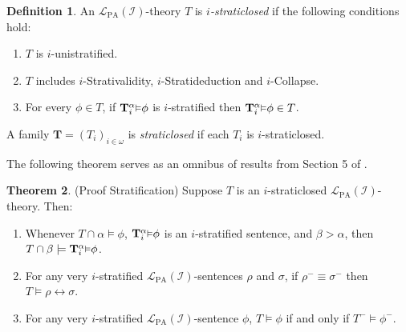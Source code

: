 \documentclass[reqno]{article}
\theoremstyle{definition}
\newtheorem{theorem}{Theorem}
\newtheorem{definition}[theorem]{Definition}
\def\L{\mathscr{L}}
\def\T{\mathbf{T}}
\def\LPA{\L_{\mathrm{PA}}}
\def\indset{\mathcal I}
\newcommand{\Prr}[2]{\T^{#1}_{#2}\mbox{\small${\vDash}$}}
\begin{document}
\begin{definition}
\label{straticloseddefn}
An $\LPA(\indset)$-theory $T$ is \emph{$i$-straticlosed} if
the following conditions hold:
\begin{enumerate}
\item $T$ is $i$-unistratified.
\item $T$ includes $i$-Strativalidity, $i$-Stratideduction and $i$-Collapse.
\item For every $\phi\in T$, if $\Prr\alpha i\phi$ is $i$-stratified then
$\Prr\alpha i\phi\in T$.
\end{enumerate}
A family $\T=(T_i)_{i\in\omega}$ is \emph{straticlosed} if each $T_i$ is
$i$-straticlosed.
\end{definition}

The following theorem serves as an omnibus of results from Section 5 of \cite{carlson2000}.

\begin{theorem}
\label{proofstratification}
(Proof Stratification)
Suppose $T$ is an $i$-straticlosed $\LPA(\indset)$-theory.
Then:
\begin{enumerate}
\item Whenever $T\cap\alpha\models\phi$,
$\Prr\alpha i\phi$ is an $i$-stratified sentence,
and $\beta>\alpha$, then $T\cap\beta\models\Prr\alpha i\phi$.
\item For any very $i$-stratified $\LPA(\indset)$-sentences $\rho$ and 
$\sigma$, if $\rho^-\equiv\sigma^-$
then $T\models \rho\leftrightarrow\sigma$.
\item
For any very $i$-stratified $\LPA(\indset)$-sentence $\phi$,
$T\models\phi$ if and only if $T^-\models\phi^-$.
\end{enumerate}
\end{theorem}
\end{document}
